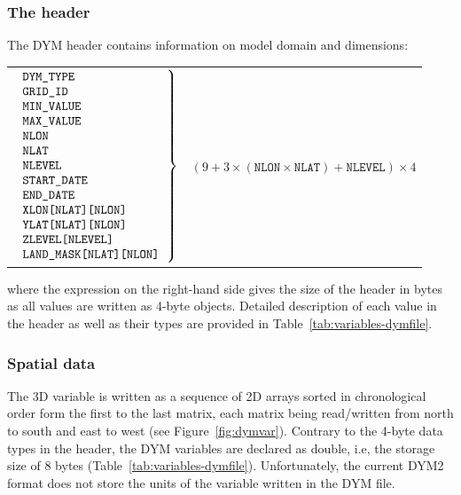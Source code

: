 \subsubsection{The header}

The DYM header contains information on model domain and dimensions:

\begin{table}[H]
 \begin{tabular}{p{5.5cm} p{7cm}}
   $\left.
   \begin{tabular}{l}
   {\ttfamily DYM\_TYPE }\\
   {\ttfamily GRID\_ID }\\
   {\ttfamily MIN\_VALUE }\\
   {\ttfamily MAX\_VALUE }\\
   {\ttfamily NLON }\\
   {\ttfamily NLAT }\\ 
   {\ttfamily NLEVEL } \\
   {\ttfamily START\_DATE }\\
   {\ttfamily END\_DATE }\\
   {\ttfamily XLON[NLAT][NLON]}\\
   {\ttfamily YLAT[NLAT][NLON]}\\
   {\ttfamily ZLEVEL[NLEVEL]}\\
   {\ttfamily LAND\_MASK[NLAT][NLON]}\\
   \end{tabular}
   \right\rbrace$ & $\left(9 + 3 \times (\texttt{NLON} \times \texttt{NLAT}) + \texttt{NLEVEL}\right)\times 4$
\end{tabular}
\end{table}

\noindent where the expression on the right-hand side gives the size of the header in bytes as all values are written as 4-byte objects. Detailed description of each value in the header as well as their types are provided in Table~\ref{tab:variables-dymfile}.

\subsubsection{Spatial data}

The 3D variable is written as a sequence of 2D arrays sorted in chronological order form the first to the last matrix, each matrix being read/written from north to south and east to west (see Figure~\ref{fig:dymvar}). Contrary to the 4-byte data types in the header, the DYM variables are declared as {\ttfamily double}, i.e, the storage size of 8 bytes (Table~\ref{tab:variables-dymfile}). Unfortunately, the current DYM2 format does not store the units of the variable written in the DYM file. 

